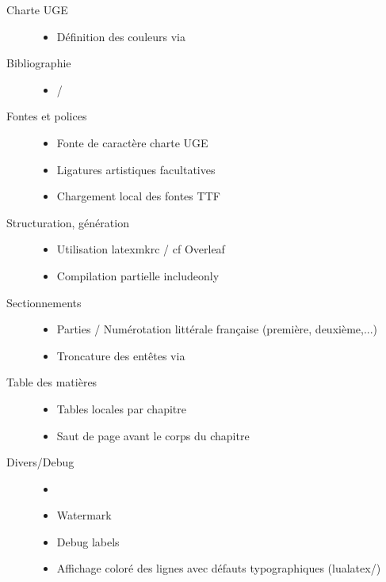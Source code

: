 \begin{description}
\item[Charte UGE]
  \begin{itemize}
  \item Définition des couleurs via 
  \end{itemize}
\item[Bibliographie]
  \begin{itemize}
  \item {}/
  \end{itemize}
\item[Fontes et polices]
  \begin{itemize}
 \item Fonte de caractère charte  UGE
\item Ligatures artistiques facultatives
\item Chargement local des fontes TTF
  \end{itemize}
\item[Structuration, génération]
  \begin{itemize}
 \item Utilisation latexmkrc / cf Overleaf
  \item Compilation partielle includeonly
  \end{itemize}
\item[Sectionnements]
  \begin{itemize}
  \item Parties / Numérotation littérale française (première, deuxième,...)
  \item Troncature des entêtes via 
  \end{itemize}
\item[Table des matières]
  \begin{itemize}
  \item Tables locales par chapitre
  \item Saut de page avant le corps du chapitre
  \end{itemize}
\item[Divers/Debug]
  \begin{itemize}
  \item \item Watermark
  \item Debug labels 
  \item Affichage coloré des lignes avec défauts typographiques (lualatex/)
  \end{itemize}
\end{description}


